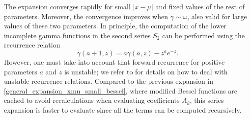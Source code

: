 \documentclass[10pt,a4paper,oneside]{article}
\numberwithin{equation}{section}
\begin{document}
The expansion converges rapidly for small $|x-\mu|$ and fixed values of the rest of parameters. Moreover, the convergence improves when $\gamma \sim \omega$, also valid for large values of these two parameters. In principle, the computation of the lower incomplete gamma functions in the second series $S_2$ can be performed using the recurrence relation
\begin{equation}
\gamma(a +1, z) = a \gamma(a, z) - z^a e^{-z}.
\end{equation}
However, one must take into account that forward recurrence for positive parameters $a$ and $z$ is unstable; we refer to \cite[\S 13]{Temme1996} for details on how to deal with unstable recurrence relations. Compared to the previous expansion in \eqref{general_expansion_xmu_small_bessel}, where modified Bessel functions are cached to avoid recalculations when evaluating coefficients $A_k$, this series expansion is faster to evaluate since all the terms can be computed recursively.
\end{document}
